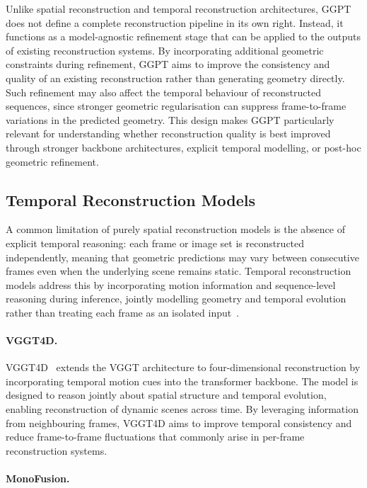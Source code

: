 Unlike spatial reconstruction and temporal reconstruction architectures, GGPT does not define a complete reconstruction pipeline in its own right. Instead, it functions as a model-agnostic refinement stage that can be applied to the outputs of existing reconstruction systems. By incorporating additional geometric constraints during refinement, GGPT aims to improve the consistency and quality of an existing reconstruction rather than generating geometry directly. Such refinement may also affect the temporal behaviour of reconstructed sequences, since stronger geometric regularisation can suppress frame-to-frame variations in the predicted geometry. This design makes GGPT particularly relevant for understanding whether reconstruction quality is best improved through stronger backbone architectures, explicit temporal modelling, or post-hoc geometric refinement.

\subsection{Temporal Reconstruction Models}
\label{sec:temporal_models}

A common limitation of purely spatial reconstruction models is the absence of explicit temporal reasoning: each frame or image set is reconstructed independently, meaning that geometric predictions may vary between consecutive frames even when the underlying scene remains static. Temporal reconstruction models address this by incorporating motion information and sequence-level reasoning during inference, jointly modelling geometry and temporal evolution rather than treating each frame as an isolated input~\cite{vggt4d}.

\paragraph{VGGT4D.}

VGGT4D~\cite{vggt4d} extends the VGGT architecture to four-dimensional reconstruction by incorporating temporal motion cues into the transformer backbone. The model is designed to reason jointly about spatial structure and temporal evolution, enabling reconstruction of dynamic scenes across time. By leveraging information from neighbouring frames, VGGT4D aims to improve temporal consistency and reduce frame-to-frame fluctuations that commonly arise in per-frame reconstruction systems.

\paragraph{MonoFusion.}


